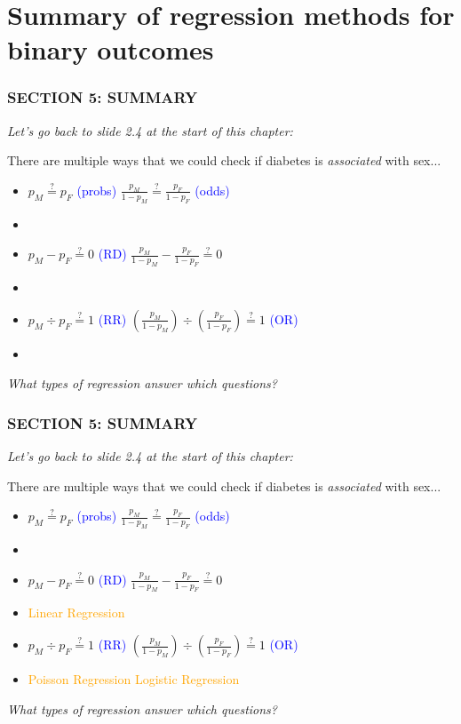 \documentclass[12pt, 
hyperref={colorlinks=true, linkcolor=blue, urlcolor=cyan}]{beamer}
\begin{document}
\section{Summary of regression methods for binary outcomes}
\begin{frame}
\frametitle{SECTION 5: SUMMARY}

\textit{Let's go back to slide 2.4 at the start of this chapter:}

There are multiple ways that we could check if diabetes is \textit{associated} with sex... 
\begin{itemize}
\item[] $p_M \stackrel{?}{=} p_F$ \textcolor{blue}{(probs)} \quad \quad \quad \quad  $\frac{p_M}{1-p_M} \stackrel{?}{=} \frac{p_F}{1-p_F}$ \textcolor{blue}{(odds)} 
\item[]
\item[] $p_M - p_F \stackrel{?}{=} 0$  \textcolor{blue}{(RD)}  \quad \quad \quad $\frac{p_M}{1-p_M} - \frac{p_F}{1-p_F} \stackrel{?}{=} 0$ 
\item[]
\item[] $p_M \div p_F \stackrel{?}{=} 1$  \textcolor{blue}{(RR)}  \quad \quad \quad  $\left(\frac{p_M}{1-p_M}\right) \div \left(\frac{p_F}{1-p_F}\right) \stackrel{?}{=} 1$ \textcolor{blue}{(OR)}
\item[]
\end{itemize} 
\textit{What types of regression answer which questions?}

\end{frame}

\begin{frame}[noframenumbering]
\frametitle{SECTION 5: SUMMARY}

\textit{Let's go back to slide 2.4 at the start of this chapter:}

There are multiple ways that we could check if diabetes is \textit{associated} with sex... 
\begin{itemize}
\item[] $p_M \stackrel{?}{=} p_F$ \textcolor{blue}{(probs)} \quad \quad \quad \quad  $\frac{p_M}{1-p_M} \stackrel{?}{=} \frac{p_F}{1-p_F}$ \textcolor{blue}{(odds)} 
\item[] 
\item[] $p_M - p_F \stackrel{?}{=} 0$  \textcolor{blue}{(RD)}  \quad \quad \quad $\frac{p_M}{1-p_M} - \frac{p_F}{1-p_F} \stackrel{?}{=} 0$ 
\item[] \textcolor{orange}{Linear Regression}
\item[] $p_M \div p_F \stackrel{?}{=} 1$  \textcolor{blue}{(RR)}  \quad \quad \quad  $\left(\frac{p_M}{1-p_M}\right) \div \left(\frac{p_F}{1-p_F}\right) \stackrel{?}{=} 1$ \textcolor{blue}{(OR)}
\item[] \textcolor{orange}{Poisson Regression} \quad \quad \quad \textcolor{orange}{Logistic Regression}
\end{itemize} 
\textit{What types of regression answer which questions?}

\end{frame}
\end{document}
